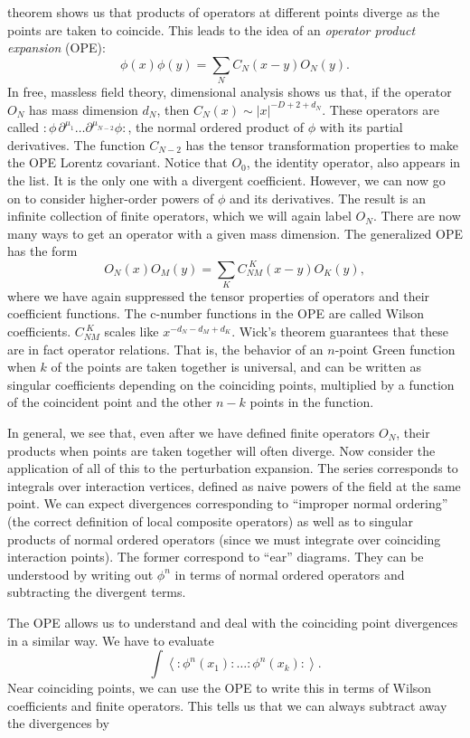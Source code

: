 theorem shows us that products of operators at different points diverge as the
points are taken to coincide. This leads to the idea of an \emph{operator
product expansion} (OPE):
\[
  \phi(x)\phi(y)=\sum_N C_N(x-y)O_N(y) .
\]
In free, massless field theory, dimensional analysis shows us that, if the
operator $O_N$ has mass dimension $d_N$, then
$C_N(x)\sim |x|^{-D+2+d_N}$. These operators are called
$:\!\phi\,\partial^{\mu_1}\ldots\partial^{\mu_{N-2}}\phi\!:$, the normal
ordered product of $\phi$ with its partial derivatives. The function $C_{N-2}$
has the tensor transformation properties to make the OPE Lorentz covariant.
Notice that $O_0$, the identity operator, also appears in the list. It is the
only one with a divergent coefficient. However, we can now go on to consider
higher-order powers of $\phi$ and its derivatives. The result is an infinite
collection of finite operators, which we will again label $O_N$. There are now
many ways to get an operator with a given mass dimension. The generalized OPE
has the form
\[
  O_N(x)O_M(y)=\sum_K C_{NM}^{\;K}(x-y)O_K(y),
\]
where we have again suppressed the tensor properties of operators and their
coefficient functions. The c-number functions in the OPE are called Wilson
coefficients. $C_{NM}^{\;K}$ scales like
$x^{-d_N-d_M+d_K}$. Wick's theorem guarantees that these are in fact operator
relations. That is, the behavior of an $n$-point Green function when $k$ of
the points are taken together is universal, and can be written as singular
coefficients depending on the coinciding points, multiplied by a function of
the coincident point and the other $n-k$ points in the function.

In general, we see that, even after we have defined finite operators $O_N$,
their products when points are taken together will often diverge. Now consider
the application of all of this to the perturbation expansion. The series
corresponds to integrals over interaction vertices, defined as naive powers of
the field at the same point. We can expect divergences corresponding to
``improper normal ordering'' (the correct definition of local composite
operators) as well as to singular products of normal ordered operators (since
we must integrate over coinciding interaction points). The former correspond
to ``ear'' diagrams. They can be understood by writing out $\phi^n$ in terms
of normal ordered operators and subtracting the divergent terms.

The OPE allows us to understand and deal with the coinciding point divergences
in a similar way. We have to evaluate
\[
  \int\left\langle:\!\phi^n(x_1)\!:\ldots:\!\phi^n(x_k)\!:\right\rangle .
\]
Near coinciding points, we can use the OPE to write this in terms of Wilson
coefficients and finite operators. This tells us that we can always subtract
away the divergences by

